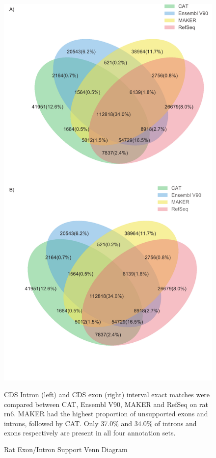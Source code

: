 \begin{figure}
\centering
\includegraphics[width=0.5\paperwidth]{Supplemental_Figure_S10.pdf}
\caption{Rat Exon/Intron Support Venn Diagram}
CDS Intron (left) and CDS exon (right) interval exact matches were compared between CAT, Ensembl V90, MAKER and RefSeq on rat rn6. MAKER had the highest proportion of unsupported exons and introns, followed by CAT. Only 37.0\% and 34.0\% of introns and exons respectively are present in all four annotation sets.
\label{supp_fig:rat_exon_intron}
\end{figure}


